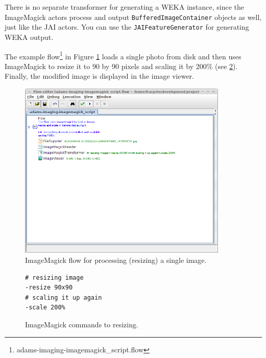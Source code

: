 \documentclass[a4paper]{book}
\begin{document}
There is no separate transformer for generating a WEKA instance, since the
ImageMagick actors process and output \texttt{BufferedImageContainer} objects as
well, just like the JAI actors. You can use the \texttt{JAIFeatureGenerator} for
generating WEKA output.

The example flow\footnote{adams-imaging-imagemagick\_script.flow} in Figure
\ref{imagemagick-resize-flow} loads a single photo from disk and then uses
ImageMagick to resize it to 90 by 90 pixels and scaling it by 200\% (see
\ref{imagemagick-resize-script}). Finally, the modified image is displayed in
the image viewer.

\begin{figure}[htb]
  \centering
  \includegraphics[width=10.0cm]{images/imagemagick-resize-flow.png}
  \caption{ImageMagick flow for processing (resizing) a single image.}
  \label{imagemagick-resize-flow}
\end{figure}

\begin{figure}[htb]
  \begin{center}
  \begin{varwidth}{\textwidth}
\begin{verbatim}
# resizing image
-resize 90x90
# scaling it up again
-scale 200%
\end{verbatim}
  \end{varwidth}
  \end{center}
  \caption{ImageMagick commands to resizing.}
  \label{imagemagick-resize-script}
\end{figure}
\end{document}
